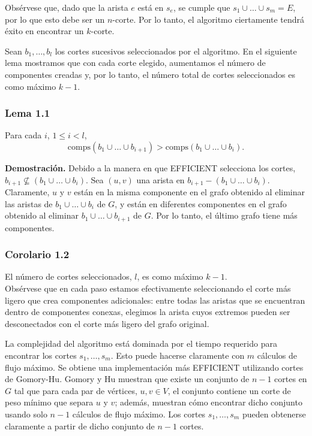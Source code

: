 \documentclass{article}
\begin{document}
Obsérvese que, dado que la arista $e$ está en $s_e$, se cumple que $s_1 \cup \dots \cup s_m = E$, por lo que esto debe ser un $n$-corte. Por lo tanto, el algoritmo ciertamente tendrá éxito en encontrar un $k$-corte.

Sean $b_1, \dots, b_l$ los cortes sucesivos seleccionados por el algoritmo. En el siguiente lema mostramos que con cada corte elegido, aumentamos el número de componentes creadas y, por lo tanto, el número total de cortes seleccionados es como máximo $k - 1$.

\subsubsection*{Lema 1.1}
Para cada $i$, $1 \leq i < l$, 
\[\text{comps}(b_1 \cup \dots \cup b_{i+1}) > \text{comps}(b_1 \cup \dots \cup b_i).\]

\textbf{Demostración.} Debido a la manera en que \textsc{EFFICIENT} selecciona los cortes, $b_{i+1} \nsubseteq (b_1 \cup \dots \cup b_i)$. Sea $(u, v)$ una arista en $b_{i+1} - (b_1 \cup \dots \cup b_i)$. Claramente, $u$ y $v$ están en la misma componente en el grafo obtenido al eliminar las aristas de $b_1 \cup \dots \cup b_i$ de $G$, y están en diferentes componentes en el grafo obtenido al eliminar $b_1 \cup \dots \cup b_{i+1}$ de $G$. Por lo tanto, el último grafo tiene más componentes.

\subsubsection*{Corolario 1.2}
El número de cortes seleccionados, $l$, es como máximo $k - 1$.\\

Obsérvese que en cada paso estamos efectivamente seleccionando el corte más ligero que crea componentes adicionales: entre todas las aristas que se encuentran dentro de componentes conexas, elegimos la arista cuyos extremos pueden ser desconectados con el corte más ligero del grafo original.

La complejidad del algoritmo está dominada por el tiempo requerido para encontrar los cortes $s_1, \dots, s_m$. Esto puede hacerse claramente con $m$ cálculos de flujo máximo. Se obtiene una implementación más EFFICIENT utilizando cortes de Gomory-Hu. Gomory y Hu \cite{GH} muestran que existe un conjunto de $n - 1$ cortes en $G$ tal que para cada par de vértices, $u, v \in V$, el conjunto contiene un corte de peso mínimo que separa $u$ y $v$; además, muestran cómo encontrar dicho conjunto usando solo $n - 1$ cálculos de flujo máximo. Los cortes $s_1, \dots, s_m$ pueden obtenerse claramente a partir de dicho conjunto de $n - 1$ cortes.
\end{document}
